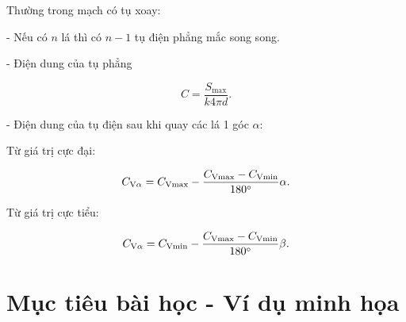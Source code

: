 Thường trong mạch có tụ xoay:

- Nếu có $n$ lá thì có $n - 1$ tụ điện phẳng mắc song song.

- Điện dung của tụ phẳng

$$C = \dfrac{S_\text{max}}{k4\pi d}.$$

- Điện dung của tụ điện sau khi quay các lá 1 góc $\alpha$:

 Từ giá trị cực đại:
 
 $$C_{\text V{\alpha}}= C_\text{V\text{max}} - \dfrac{C_\text{V\text{max}}- C_\text{V\text{min}}}{180^\circ}\alpha.$$
 
 Từ giá trị cực tiểu:

$$C_{\text V{\alpha}}= C_\text{V\text{min}} - \dfrac{C_\text{V\text{max}}- C_\text{V\text{min}}}{180^\circ}\beta.$$


\section{Mục tiêu bài học - Ví dụ minh họa}

